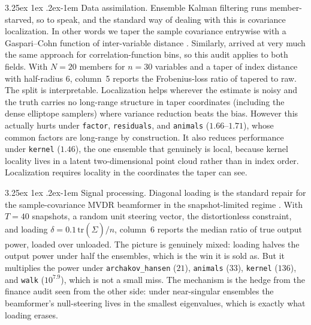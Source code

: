 \documentclass[11pt]{article}
\makeatletter
\renewcommand\paragraph{\@startsection{paragraph}{4}{\z@}%
  {3.25ex \@plus1ex \@minus.2ex}{-1em}%
  {\normalfont\normalsize\itshape}}
\makeatother
\begin{document}
\paragraph{Data assimilation.} Ensemble Kalman filtering runs
member-starved, so to speak, and the standard way of dealing with this is covariance localization. In other words we
taper the sample covariance entrywise with a Gaspari--Cohn function \citep{gaspari1999} of inter-variable distance
\citep{houtekamer2001,hamill2001}. Similarly, \citet{paz2015} arrived at very much the same approach for
correlation-function bins, so this audit applies to both fields. With $N=20$ members for $n=30$ variables and a
taper of index distance with half-radius $6$, column~5 reports the
Frobenius-loss ratio of tapered to raw. The split is interpretable. Localization helps wherever the
estimate is noisy and the truth carries no long-range structure in taper
coordinates (including the dense elliptope samplers) where variance
reduction beats the bias. However this actually hurts under \texttt{factor},
\texttt{residuals}, and \texttt{animals} ($1.66$--$1.71$), whose common
factors are long-range by construction. It also reduces performance under
\texttt{kernel} ($1.46$), the one ensemble that genuinely is local,
because kernel locality lives in a latent two-dimensional point cloud
rather than in index order. Localization requires locality in the
coordinates the taper can see.

\paragraph{Signal processing.} Diagonal loading is the standard repair
for the sample-covariance MVDR beamformer in the snapshot-limited regime
\citep{cox1987,carlson1988}. With $T=40$ snapshots, a
random unit steering vector, the distortionless constraint, and loading
$\delta=0.1\,\mathrm{tr}(\hat\Sigma)/n$, column~6 reports the median
ratio of true output power, loaded over unloaded. The picture is genuinely mixed: loading halves the
output power under half the ensembles, which is the win it is sold as. But it multiplies the power under
\texttt{archakov\_hansen} ($21$), \texttt{animals} ($33$),
\texttt{kernel} ($136$), and \texttt{walk} ($10^{7.9}$), which is not a small miss. The mechanism
is the hedge from the finance audit seen from the other side: under
near-singular ensembles the beamformer's null-steering lives in the
smallest eigenvalues, which is exactly what loading erases.
\end{document}
